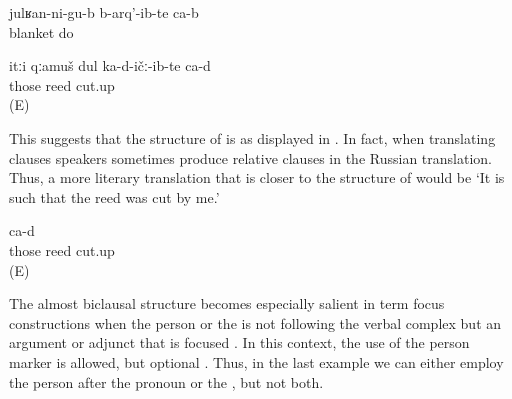 \begin{exe}
	\ex	\label{ex:‎(I) gave birth to (my children) under a blanket analytic}
	\gll	julʁan-ni-gu-b	b-arq'-ib-te	ca-b\\
		blanket	do 	\\
	\glt	{}
\end{exe}

\begin{exe}
\ex
\begin{xlist}
	\ex	\label{ex:I cut that reed analytic}
	\gll	itːi	qːamuš	dul	ka-d-ičː-ib-te	ca-d\\
		those	reed		cut.up	\\
	\glt	{} (E)
	
\end{xlist}
\end{exe}

This suggests that the structure of  is as displayed in . In fact, when translating  clauses speakers sometimes produce relative clauses in the Russian translation. Thus, a more literary translation that is closer to the structure of  would be `It is such that the reed was cut by me.' 

\begin{exe}
	\ex	\label{ex:I cut that reed Russian relative clause analytic}
		ca-d\\
		those	reed		cut.up	\\
	\glt	{} (E)
	

\end{exe}

The almost biclausal structure becomes especially salient in term focus constructions when the person  or the  is not following the verbal complex but an argument or adjunct that is focused . In this context, the use of the person marker is allowed, but optional . Thus, in the last example we can either employ the person  after the pronoun or the , but not both.

